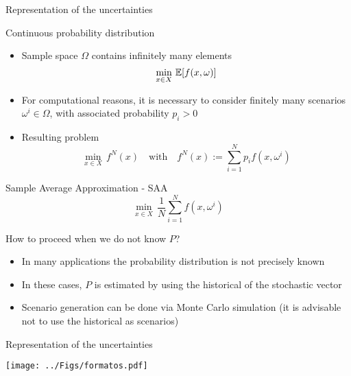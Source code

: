 \begin{frame}{Representation of the uncertainties}
\begin{block}{Continuous probability distribution}
\begin{itemize}
\item Sample space  $\Omega$ contains infinitely many elements
\[
\min_{x \in X}\, \mathbb{E}[f(x,\omega)]
\]

\item  For computational reasons, it is necessary to  consider finitely many scenarios $\omega^i \in \Omega$, with associated probability $p_i>0$
\pula

\item Resulting problem
\[ 
\min_{x \in X}\, f^N(x)\quad \mbox{with}\quad f^N(x):=\sum_{i=1}^{N}p_if(x,\omega^i)
\]
\end{itemize}
\end{block}
\begin{block}{Sample Average Approximation - SAA}
\[
\min_{x \in X}\, \frac{1}{N}\sum_{i=1}^{N}f(x,\omega^i)
\]
\end{block}
 \end{frame}
 
 
 
\begin{frame}
\begin{block}{How to proceed when we do not know $P$?}
\begin{itemize}
\item In many applications the probability distribution is not precisely known
\pula

\item In these cases, $ P $ is estimated by using the historical of the stochastic vector
\pula

\item Scenario generation can be done via Monte Carlo simulation (it is advisable not to use
the historical as scenarios)
\end{itemize}
\pula
\end{block}
\begin{block}{Representation of the uncertainties}
\begin{center}
\texttt{[image: ../Figs/formatos.pdf]} {}
\end{center}
\end{block} 
\end{frame}





